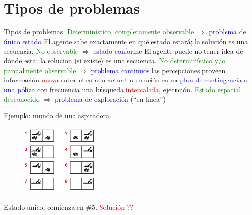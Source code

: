 \documentclass{beamer}
\theoremstyle{definition}
\theoremstyle{theorem}
\theoremstyle{remark}
\begin{document}

\section{Tipos de problemas}%

\begin{frame}{Tipos de problemas.}
\textcolor{green}{Determinístico, completamente observable} $\Rightarrow$ \textcolor{blue}{problema de único estado} \newline
\blank{1cm}El agente sabe exactamente en qué estado estará; la solución es una secuencia.
\newline
\textcolor{green}{No observable} $\Rightarrow$ \textcolor{blue}{estado conforme} \newline
\blank{1cm}El agente puede no tener idea de dónde esta; la solucion (si existe) es una secuencia.
\newline
\textcolor{green}{No determinístico y/o parcialmente observable} $\Rightarrow$ \textcolor{blue}{problema continuos} \newline
\blank{1cm}las percepciones proveen información \textcolor{red}{nueva} sobre el estado actual\newline
\blank{1cm}la solución es un \textcolor{blue}{plan de contingencia} o \textcolor{blue}{una póliza}\newline
\blank{1cm}con frecuencia una búsqueda \textcolor{red}{intercalada}, ejecución.\newlin
\newline
\textcolor{green}{Estado espacial desconocido} $\Rightarrow$ \textcolor{blue}{problema de exploración} (“en línea”)
\end{frame}



\begin{frame}{Ejemplo: mundo de una aspiradora}
\begin{figure} %
    \centering
    \includegraphics[width=0.35\textwidth]{8_image_example1.PNG}
        \end{figure}

    Estado-único, comienza en \#5. \textcolor{red}{Solución ??}
\end{frame}
\end{document}
